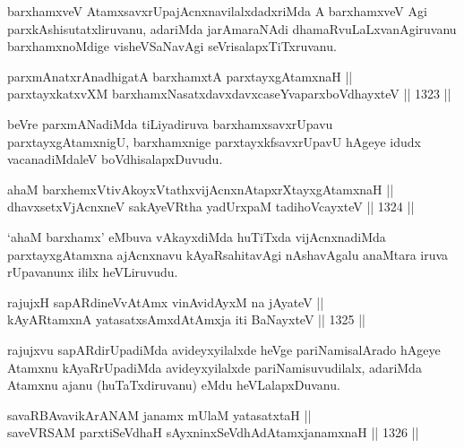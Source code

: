 \begin{artha}
barxhamxveV AtamxsavxrUpajAcnxnavilalxdadxriMda A barxhamxveV Agi parxkAshisutatxliruvanu, adariMda jarAmaraNAdi dhamaRvuLaLxvanAgiruvanu barxhamxnoMdige visheVSaNavAgi seVrisalapxTiTxruvanu.
\end{artha}


\begin{shl}
parxmAnatxrAnadhigatA barxhamxtA parxtayxgAtamxnaH || \\
parxtayxkatxvXM barxhamxNasatxdavxdavxcaseYva\footnotemark[1] parxboVdhayxteV ||  1323 ||  
\end{shl}

\begin{artha}
beVre parxmANadiMda tiLiyadiruva barxhamxsavxrUpavu parxtayxgAtamxnigU, barxhamxnige parxtayxkfsavxrUpavU hAgeye idudx vacanadiMdaleV boVdhisalapxDuvudu.
\end{artha}


\begin{shl}
ahaM barxhemxVtivAkoyxVtathxvijAcnxnAtapxrXtayxgAtamxnaH ||  \\
dhavxsetxV\s jAcnxneV sakAyeVR\s tha yadUrxpaM tadihoVcayxteV ||  1324 ||  
\end{shl}

\begin{artha}
`ahaM barxhamx' eMbuva vAkayxdiMda huTiTxda vijAcnxnadiMda parxtayxgAtamxna ajAcnxnavu kAyaRsahitavAgi nAshavAgalu anaMtara iruva rUpavanunx ililx heVLiruvudu.
\end{artha}

\begin{shl}
rajujxH sapARdineVvA\s \s tAmx vinA\s vidAyxM na jAyateV || \\
kAyARtamxnA yatasatxsAmxdAtAmx\s ja iti BaNayxteV ||  1325 ||  
\end{shl}

\begin{artha}
rajujxvu sapARdirUpadiMda avideyxyilalxde heVge pariNamisalArado hAgeye Atamxnu kAyaRrUpadiMda avideyxyilalxde pariNamisuvudilalx, adariMda Atamxnu ajanu (huTaTxdiruvanu) eMdu heVLalapxDuvanu.
\end{artha}


\begin{shl}
savaRBAvavikArANAM janamx mUlaM yatasatxtaH || \\
saveVRSAM parxtiSeVdhaH sAyxninxSeVdhAdAtamxjanamxnaH ||  1326 ||  
\end{shl}

